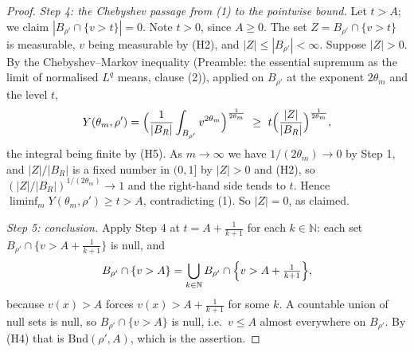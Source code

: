 \begin{proof}
\emph{Step 4: the Chebyshev passage from (1) to the pointwise bound.}  Let
$t>A$; we claim $|B_{\rho'}\cap\{v>t\}|=0$.  Note $t>0$, since $A\ge0$.  The
set $Z=B_{\rho'}\cap\{v>t\}$ is measurable, $v$ being measurable by (H2), and
$|Z|\le|B_{\rho'}|<\infty$.  Suppose $|Z|>0$.  By the Chebyshev--Markov
inequality (Preamble: the essential supremum as the limit of normalised $L^q$
means, clause (2)), applied on $B_{\rho'}$ at the exponent $2\theta_m$ and the
level $t$,
\[
Y(\theta_m,\rho')
=\Bigl(\frac1{|B_R|}\int_{B_{\rho'}}v^{2\theta_m}\Bigr)^{\frac1{2\theta_m}}
\ \ge\ t\Bigl(\frac{|Z|}{|B_R|}\Bigr)^{\frac1{2\theta_m}} ,
\]
the integral being finite by (H5).  As $m\to\infty$ we have
$1/(2\theta_m)\to0$ by Step 1, and $|Z|/|B_R|$ is a fixed number in $(0,1]$ by
$|Z|>0$ and (H2), so $(|Z|/|B_R|)^{1/(2\theta_m)}\to1$ and the right-hand side
tends to $t$.  Hence $\liminf_mY(\theta_m,\rho')\ge t>A$, contradicting (1).
So $|Z|=0$, as claimed.

\emph{Step 5: conclusion.}  Apply Step 4 at $t=A+\frac1{k+1}$ for each
$k\in\mathbb{N}$: each set $B_{\rho'}\cap\{v>A+\frac1{k+1}\}$ is null, and
\[
B_{\rho'}\cap\{v>A\}=\bigcup_{k\in\mathbb{N}}
B_{\rho'}\cap\Bigl\{v>A+\tfrac1{k+1}\Bigr\},
\]
because $v(x)>A$ forces $v(x)>A+\frac1{k+1}$ for some $k$.  A countable union
of null sets is null, so $B_{\rho'}\cap\{v>A\}$ is null, i.e.\ $v\le A$ almost
everywhere on $B_{\rho'}$.  By (H4) that is $\mathrm{Bnd}(\rho',A)$, which is
the assertion.
\end{proof}
